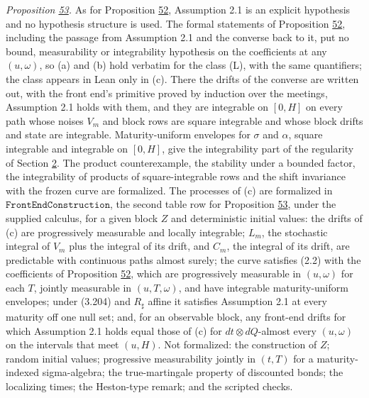 \documentclass[11pt]{article}
\begin{document}
\emph{Proposition \hyperref[res:Proposition-53]{53}.} As for Proposition \hyperref[res:Proposition-52]{52}, Assumption 2.1 is an explicit hypothesis and no hypothesis structure is used. The formal statements of Proposition \hyperref[res:Proposition-52]{52}, including the passage from Assumption 2.1 and the converse back to it, put no bound, measurability or integrability hypothesis on the coefficients at any \((u,\omega)\), so (a) and (b) hold verbatim for the class (L), with the same quantifiers; the class appears in Lean only in (c). There the drifts of the converse are written out, with the front end's primitive proved by induction over the meetings, Assumption 2.1 holds with them, and they are integrable on \([0,H]\) on every path whose noises \(V_m\) and block rows are square integrable and whose block drifts and state are integrable. Maturity-uniform envelopes for \(\sigma\) and \(\alpha\), square integrable and integrable on \([0,H]\), give the integrability part of the regularity of Section \hyperref[sec:2]{2}. The product counterexample, the stability under a bounded factor, the integrability of products of square-integrable rows and the shift invariance with the frozen curve are formalized. The processes of (c) are formalized in \(\texttt{FrontEndConstruction}\), the second table row for Proposition \hyperref[res:Proposition-53]{53}, under the supplied calculus, for a given block \(Z\) and deterministic initial values: the drifts of (c) are progressively measurable and locally integrable; \(L_m\), the stochastic integral of \(V_m\) plus the integral of its drift, and \(C_m\), the integral of its drift, are predictable with continuous paths almost surely; the curve satisfies (2.2) with the coefficients of Proposition \hyperref[res:Proposition-52]{52}, which are progressively measurable in \((u,\omega)\) for each \(T\), jointly measurable in \((u,T,\omega)\), and have integrable maturity-uniform envelopes; under (3.204) and \(R_\sharp\) affine it satisfies Assumption 2.1 at every maturity off one null set; and, for an observable block, any front-end drifts for which Assumption 2.1 holds equal those of (c) for \(dt\otimes dQ\)-almost every \((u,\omega)\) on the intervals that meet \((u,H)\). Not formalized: the construction of \(Z\); random initial values; progressive measurability jointly in \((t,T)\) for a maturity-indexed sigma-algebra; the true-martingale property of discounted bonds; the localizing times; the Heston-type remark; and the scripted checks.



\end{document}
